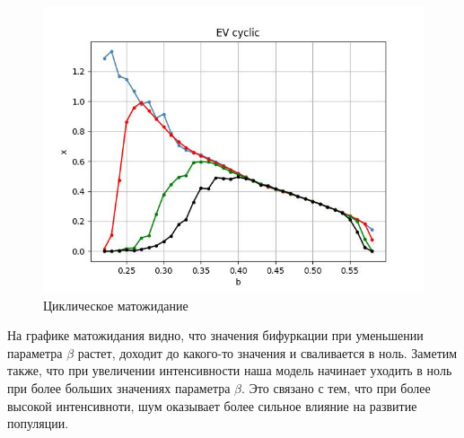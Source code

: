     \begin{figure}
        \centering
        \includegraphics[width=\textwidth]{stochastic/images/EV_cyclic.jpg}
        
        \captionsetup{justification=centering}
        \caption{Циклическое матожидание}
        \label{EV_cyclic}
    \end{figure}

    На графике матожидания видно, что значения бифуркации при уменьшении параметра \(\beta\) растет, доходит до какого-то значения и сваливается в ноль. Заметим также, что при увеличении интенсивности наша модель начинает уходить в ноль при более больших значениях параметра \(\beta\). Это связано с тем, что при более высокой интенсивноти, шум оказывает более сильное влияние на развитие популяции.




